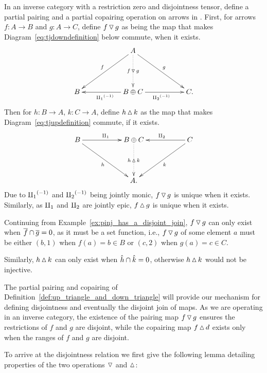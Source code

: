 \begin{definition}\label{def:up_triangle_and_down_triangle}
  In an inverse category \X with a restriction zero and disjointness tensor, define a partial
  pairing and a partial copairing operation on arrows in  \X. First, for arrows
  $f:A \to B$ and $g:A \to C$, define $f\operatorname{\triangledown} g$ as
  being the map that makes Diagram~\ref{eq:tjdowndefinition} below commute, when it exists.
  \begin{equation}
    \xymatrix@C+0pt @R+20pt{
      &&A \ar[dll]_{f} \ar[drr]^{g} \ar@{.>}[d]|-{f\tjdown g}\\
      B&&B\+C \ar[ll]^{\icpa} \ar[rr]_{\icpb} && C.
      }\label{eq:tjdowndefinition}
  \end{equation}
  Then for $h:B \to A$, $k: C \to A$, define $h\operatorname{\vartriangle} k$ as the map that makes
  Diagram~\ref{eq:tjupdefinition} commute, if it exists.
  \begin{equation}
    \xymatrix@C+0pt @R+20pt{
      B\ar[rr]^{\cpa} \ar[drr]_{h} &&B\+C   \ar@{.>}[d]|-{h\tjup k}
        && C \ar[ll]_{\cpb} \ar[dll]^{k}\\
      &&A.
      }\label{eq:tjupdefinition}
  \end{equation}
  Due to ${\amalg_{1}}^{(-1)}$ and ${\amalg_{2}}^{(-1)}$ being jointly monic, $f\operatorname{\triangledown} g$ is unique when it exists.
  Similarly, as $\amalg_{1}$ and $\amalg_{2}$ are jointly epic, $f\operatorname{\vartriangle} g$ is unique when it exists.
\end{definition}
\begin{example}[\pinj]\label{ex:pinj_has_triangle_maps_when_restriction_is_disjoint}
  Continuing from Example~\ref{ex:pinj_has_a_disjoint_join}, $f\operatorname{\triangledown} g$ can only exist
  when $\overline{f} \cap \overline{g} = 0$, as it must be a set function, i.e., $f\operatorname{\triangledown} g$ of some element
  $a$ must be either $(b,1)$ when  $f(a) = b\in B$ or $(c,2)$ when $g(a) = c\in C$.

  Similarly, $h\operatorname{\vartriangle} k$ can only exist when $\hat{h} \cap \hat{k} = 0$, otherwise $h\operatorname{\vartriangle} k$ would
  not be injective.
\end{example}

The partial pairing and copairing of Definition~\ref{def:up_triangle_and_down_triangle} will provide
our mechanism for defining disjointness and eventually the disjoint join of maps. As we are
operating in an inverse category, the existence of
the pairing map $f\operatorname{\triangledown} g$ ensures the restrictions of $f$ and $g$ are disjoint, while
the copairing map $f\operatorname{\vartriangle} d$ exists only when the ranges of $f$ and $g$ are disjoint.

To arrive at the disjointness relation we first give the following lemma detailing properties of the
two operations $\operatorname{\triangledown}$ and $\operatorname{\vartriangle}$:


